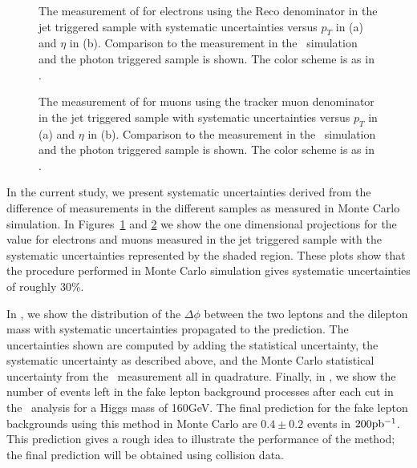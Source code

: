 \documentclass{cmspaper}
\begin{document}
\begin{figure}[htb]
  \begin{center}
    \caption{The measurement of \epsilonFake for electrons using the Reco denominator in the jet triggered sample with systematic uncertainties versus $p_T$ in (a) and $\eta$ in (b). Comparison to the measurement in the \WPlusJets\ simulation and the photon triggered sample is shown. The color  scheme is as in .}
    \label{fig:electronFakeRate_WithSystematics}
  \end{center}
\end{figure}

\begin{figure}[htb]
  \begin{center}
    \caption{The measurement of \epsilonFake for muons using the tracker muon denominator in the jet triggered sample with systematic uncertainties versus $p_T$ in (a) and $\eta$ in (b). Comparison to the measurement in the \WPlusJets\ simulation and the photon triggered sample is shown. The color  scheme is as in .}
    \label{fig:muonFakeRate_WithSystematics}
  \end{center}
\end{figure}

In the current study, we present systematic uncertainties derived from the difference of measurements in the different samples as measured in Monte Carlo simulation. In Figures~\ref{fig:electronFakeRate_WithSystematics} and \ref{fig:muonFakeRate_WithSystematics} we show the one dimensional projections for the \epsilonFake value for electrons and muons measured in the jet triggered sample with the systematic uncertainties represented by the shaded region. These plots show that the procedure performed in Monte Carlo simulation gives systematic uncertainties of roughly 30\%.

In , we show the distribution of the $\Delta\phi$ between the two leptons and the dilepton mass with systematic uncertainties propagated to the prediction. The uncertainties shown are computed by adding the statistical uncertainty, the systematic uncertainty as described above, and the Monte Carlo statistical uncertainty from the \epsilonFake~measurement all in quadrature. Finally, in , we show the number of events left in the fake lepton background processes after each cut in the \HiggsToWW\ analysis for a Higgs mass of 160GeV. The final prediction for the fake lepton backgrounds using this method in Monte Carlo are $0.4\pm0.2$ events in $200\mathrm{pb^{-1}}$. This prediction gives a rough idea to illustrate the performance of the method; the final prediction will be obtained using collision data.
\end{document}
